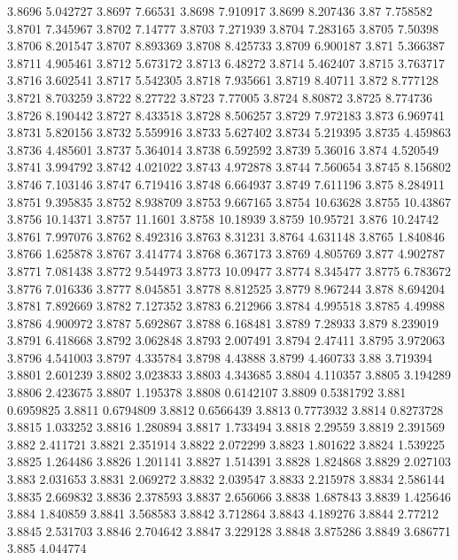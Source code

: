 3.8696  5.042727
3.8697  7.66531
3.8698  7.910917
3.8699  8.207436
3.87  7.758582
3.8701  7.345967
3.8702  7.14777
3.8703  7.271939
3.8704  7.283165
3.8705  7.50398
3.8706  8.201547
3.8707  8.893369
3.8708  8.425733
3.8709  6.900187
3.871  5.366387
3.8711  4.905461
3.8712  5.673172
3.8713  6.48272
3.8714  5.462407
3.8715  3.763717
3.8716  3.602541
3.8717  5.542305
3.8718  7.935661
3.8719  8.40711
3.872  8.777128
3.8721  8.703259
3.8722  8.27722
3.8723  7.77005
3.8724  8.80872
3.8725  8.774736
3.8726  8.190442
3.8727  8.433518
3.8728  8.506257
3.8729  7.972183
3.873  6.969741
3.8731  5.820156
3.8732  5.559916
3.8733  5.627402
3.8734  5.219395
3.8735  4.459863
3.8736  4.485601
3.8737  5.364014
3.8738  6.592592
3.8739  5.36016
3.874  4.520549
3.8741  3.994792
3.8742  4.021022
3.8743  4.972878
3.8744  7.560654
3.8745  8.156802
3.8746  7.103146
3.8747  6.719416
3.8748  6.664937
3.8749  7.611196
3.875  8.284911
3.8751  9.395835
3.8752  8.938709
3.8753  9.667165
3.8754  10.63628
3.8755  10.43867
3.8756  10.14371
3.8757  11.1601
3.8758  10.18939
3.8759  10.95721
3.876  10.24742
3.8761  7.997076
3.8762  8.492316
3.8763  8.31231
3.8764  4.631148
3.8765  1.840846
3.8766  1.625878
3.8767  3.414774
3.8768  6.367173
3.8769  4.805769
3.877  4.902787
3.8771  7.081438
3.8772  9.544973
3.8773  10.09477
3.8774  8.345477
3.8775  6.783672
3.8776  7.016336
3.8777  8.045851
3.8778  8.812525
3.8779  8.967244
3.878  8.694204
3.8781  7.892669
3.8782  7.127352
3.8783  6.212966
3.8784  4.995518
3.8785  4.49988
3.8786  4.900972
3.8787  5.692867
3.8788  6.168481
3.8789  7.28933
3.879  8.239019
3.8791  6.418668
3.8792  3.062848
3.8793  2.007491
3.8794  2.47411
3.8795  3.972063
3.8796  4.541003
3.8797  4.335784
3.8798  4.43888
3.8799  4.460733
3.88  3.719394
3.8801  2.601239
3.8802  3.023833
3.8803  4.343685
3.8804  4.110357
3.8805  3.194289
3.8806  2.423675
3.8807  1.195378
3.8808  0.6142107
3.8809  0.5381792
3.881  0.6959825
3.8811  0.6794809
3.8812  0.6566439
3.8813  0.7773932
3.8814  0.8273728
3.8815  1.033252
3.8816  1.280894
3.8817  1.733494
3.8818  2.29559
3.8819  2.391569
3.882  2.411721
3.8821  2.351914
3.8822  2.072299
3.8823  1.801622
3.8824  1.539225
3.8825  1.264486
3.8826  1.201141
3.8827  1.514391
3.8828  1.824868
3.8829  2.027103
3.883  2.031653
3.8831  2.069272
3.8832  2.039547
3.8833  2.215978
3.8834  2.586144
3.8835  2.669832
3.8836  2.378593
3.8837  2.656066
3.8838  1.687843
3.8839  1.425646
3.884  1.840859
3.8841  3.568583
3.8842  3.712864
3.8843  4.189276
3.8844  2.77212
3.8845  2.531703
3.8846  2.704642
3.8847  3.229128
3.8848  3.875286
3.8849  3.686771
3.885  4.044774
